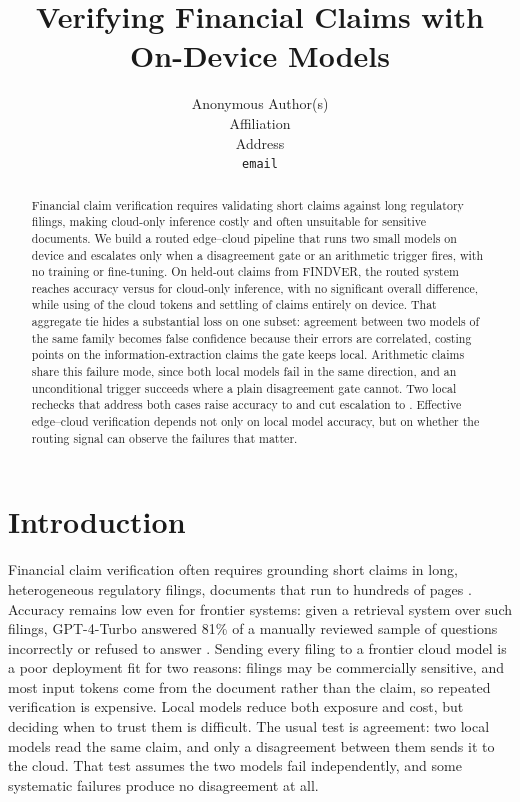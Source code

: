 \documentclass{article}
\title{Verifying Financial Claims with On-Device Models}
\author{%
  Anonymous Author(s) \\
  Affiliation \\
  Address \\
  \texttt{email} \\
}
\begin{document}
\maketitle

\begin{abstract}
Financial claim verification requires validating short claims against long regulatory filings, making cloud-only inference costly and often unsuitable for sensitive documents. We build a routed edge--cloud pipeline that runs two small models on device and escalates only when a disagreement gate or an arithmetic trigger fires, with no training or fine-tuning. On \nTest{} held-out claims from FINDVER, the routed system reaches \accRouted{} accuracy versus \accCloud{} for cloud-only inference, with no significant overall difference, while using \costRatio{} of the cloud tokens and settling \onDeviceRate{} of claims entirely on device. That aggregate tie hides a substantial loss on one subset: agreement between two models of the same family becomes false confidence because their errors are correlated, costing \keptLocalIEGap{} points on the information-extraction claims the gate keeps local. Arithmetic claims share this failure mode, since both local models fail in the same direction, and an unconditional trigger succeeds where a plain disagreement gate cannot. Two local rechecks that address both cases raise accuracy to \accFull{} and cut escalation to \fullEscRate{}. Effective edge--cloud verification depends not only on local model accuracy, but on whether the routing signal can observe the failures that matter.
\end{abstract}

\section{Introduction}
\label{sec:intro}
Financial claim verification often requires grounding short claims in long, heterogeneous regulatory filings, documents that run to hundreds of pages \citep{reddy2024docfinqa}. Accuracy remains low even for frontier systems: given a retrieval system over such filings, GPT-4-Turbo answered 81\% of a manually reviewed sample of questions incorrectly or refused to answer \citep{islam2023financebench}. Sending every filing to a frontier cloud model is a poor deployment fit for two reasons: filings may be commercially sensitive, and most input tokens come from the document rather than the claim, so repeated verification is expensive. Local models reduce both exposure and cost, but deciding when to trust them is difficult. The usual test is agreement: two local models read the same claim, and only a disagreement between them sends it to the cloud. That test assumes the two models fail independently, and some systematic failures produce no disagreement at all.
\end{document}
